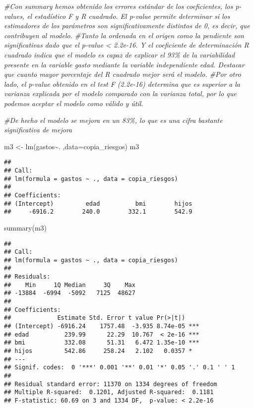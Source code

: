 \documentclass[
]{book}
\newenvironment{Shaded}{\begin{snugshade}}{\end{snugshade}}
\newcommand{\AttributeTok}[1]{\textcolor[rgb]{0.77,0.63,0.00}{#1}}
\newcommand{\CommentTok}[1]{\textcolor[rgb]{0.56,0.35,0.01}{\textit{#1}}}
\newcommand{\FunctionTok}[1]{\textcolor[rgb]{0.00,0.00,0.00}{#1}}
\newcommand{\NormalTok}[1]{#1}
\newcommand{\OtherTok}[1]{\textcolor[rgb]{0.56,0.35,0.01}{#1}}
\newcommand{\SpecialCharTok}[1]{\textcolor[rgb]{0.00,0.00,0.00}{#1}}
\begin{document}
\begin{Shaded}
\begin{Highlighting}[]
\CommentTok{\#Con summary hemos obtenido los errores estándar de los coeficientes, los p{-}values, el estadístico F y R cuadrado. El p{-}value  permite determinar si los estimadores de los parámetros son significativamente distintos de 0, es decir, que contribuyen al modelo.}
\CommentTok{\#Tanto la ordenada en el origen como la pendiente son significativas dado que el p{-}value \textless{} 2.2e{-}16. Y el coeficiente de determinación R cuadrado indica que el modelo es capaz de explicar el 93\% de la variabilidad presente en la variable gasto mediante la variable independiente edad. Destacar que cuanto mayor porcentaje del R cuadrado mejor será el modelo.}
\CommentTok{\#Por otro lado, el p{-}value obtenido en el test F (2.2e{-}16) determina que es superior a la varianza explicada por el modelo comparado con la varianza total, por lo que podemos aceptar el modelo como válido y útil.}

\CommentTok{\#De hecho el modelo se mejora en un 83\%, lo que es una cifra bastante significativa de mejora}
\end{Highlighting}
\end{Shaded}

\begin{Shaded}
\begin{Highlighting}[]
\NormalTok{m3 }\OtherTok{\textless{}{-}} \FunctionTok{lm}\NormalTok{(gastos}\SpecialCharTok{\textasciitilde{}}\NormalTok{. ,}\AttributeTok{data=}\NormalTok{copia\_riesgos)}
\NormalTok{m3}
\end{Highlighting}
\end{Shaded}

\begin{verbatim}
## 
## Call:
## lm(formula = gastos ~ ., data = copia_riesgos)
## 
## Coefficients:
## (Intercept)         edad          bmi        hijos  
##     -6916.2        240.0        332.1        542.9
\end{verbatim}

\begin{Shaded}
\begin{Highlighting}[]
\FunctionTok{summary}\NormalTok{(m3)}
\end{Highlighting}
\end{Shaded}

\begin{verbatim}
## 
## Call:
## lm(formula = gastos ~ ., data = copia_riesgos)
## 
## Residuals:
##    Min     1Q Median     3Q    Max 
## -13884  -6994  -5092   7125  48627 
## 
## Coefficients:
##             Estimate Std. Error t value Pr(>|t|)    
## (Intercept) -6916.24    1757.48  -3.935 8.74e-05 ***
## edad          239.99      22.29  10.767  < 2e-16 ***
## bmi           332.08      51.31   6.472 1.35e-10 ***
## hijos         542.86     258.24   2.102   0.0357 *  
## ---
## Signif. codes:  0 '***' 0.001 '**' 0.01 '*' 0.05 '.' 0.1 ' ' 1
## 
## Residual standard error: 11370 on 1334 degrees of freedom
## Multiple R-squared:  0.1201, Adjusted R-squared:  0.1181 
## F-statistic: 60.69 on 3 and 1334 DF,  p-value: < 2.2e-16
\end{verbatim}
\end{document}
